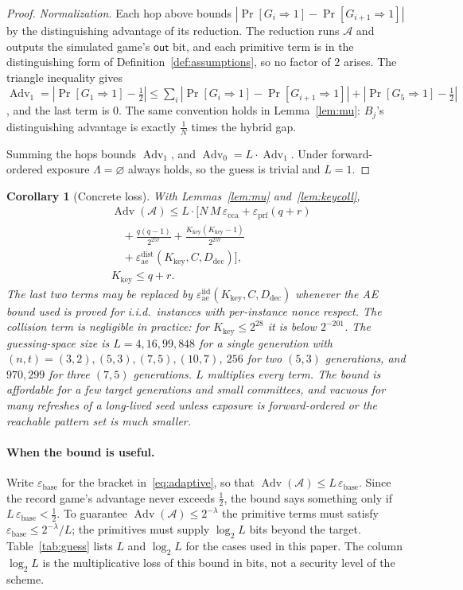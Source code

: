 \documentclass[pdflatex,sn-mathphys-num,twocolumn]{sn-jnl}
\theoremstyle{plain}
\newtheorem{corollary}[theorem]{Corollary}
\theoremstyle{definition}
\newcommand{\Adv}{\operatorname{Adv}}
\begin{document}
\begin{proof}
\emph{Normalization.} Each hop above bounds $|\Pr[G_i\Rightarrow1]-\Pr[G_{i+1}\Rightarrow1]|$ by the distinguishing advantage of its reduction. The reduction runs $\mathcal A$ and outputs the simulated game's $\mathsf{out}$ bit, and each primitive term is in the distinguishing form of Definition~\ref{def:assumptions}, so no factor of $2$ arises. The triangle inequality gives $\Adv_1=|\Pr[G_1\Rightarrow1]-\tfrac12|\le\sum_i|\Pr[G_i\Rightarrow1]-\Pr[G_{i+1}\Rightarrow1]|+|\Pr[G_5\Rightarrow1]-\tfrac12|$, and the last term is $0$. The same convention holds in Lemma~\ref{lem:mu}: $B_j$'s distinguishing advantage is exactly $\tfrac1N$ times the hybrid gap.

Summing the hops bounds $\Adv_1$, and $\Adv_0=L\cdot\Adv_1$. Under forward-ordered exposure $\Lambda=\varnothing$ always holds, so the guess is trivial and $L=1$.
\end{proof}

\begin{corollary}[Concrete loss]\label{cor:loss}
With Lemmas~\ref{lem:mu} and~\ref{lem:keycoll},
\begin{align*}
 &\Adv(\mathcal A)\le L\cdot\Big[N\,M\,\varepsilon_{\mathrm{cca}}+\varepsilon_{\mathrm{prf}}(q+r)\\
 &\quad+\frac{q(q-1)}{2^{257}}+\frac{K_{\mathrm{key}}(K_{\mathrm{key}}-1)}{2^{257}}\\
 &\quad+\varepsilon^{\mathrm{dist}}_{\mathrm{ae}}(K_{\mathrm{key}},C,D_{\mathrm{dec}})\Big],\\
 &K_{\mathrm{key}}\le q+r.
\end{align*}
The last two terms may be replaced by $\varepsilon^{\mathrm{iid}}_{\mathrm{ae}}(K_{\mathrm{key}},C,D_{\mathrm{dec}})$ whenever the AE bound used is proved for i.i.d.\ instances with per-instance nonce respect. The collision term is negligible in practice: for $K_{\mathrm{key}}\le2^{28}$ it is below $2^{-201}$.
The guessing-space size is $L=4,16,99,848$ for a single generation with $(n,t)=(3,2),(5,3),(7,5),(10,7)$, $256$ for two $(5,3)$ generations, and $970{,}299$ for three $(7,5)$ generations. $L$ multiplies every term. The bound is affordable for a few target generations and small committees, and vacuous for many refreshes of a long-lived seed unless exposure is forward-ordered or the reachable pattern set is much smaller.
\end{corollary}

\paragraph{When the bound is useful.}
Write $\varepsilon_{\mathrm{base}}$ for the bracket in~\eqref{eq:adaptive}, so that $\Adv(\mathcal A)\le L\,\varepsilon_{\mathrm{base}}$. Since the record game's advantage never exceeds $\tfrac12$, the bound says something only if $L\,\varepsilon_{\mathrm{base}}<\tfrac12$. To guarantee $\Adv(\mathcal A)\le2^{-\lambda}$ the primitive terms must satisfy $\varepsilon_{\mathrm{base}}\le2^{-\lambda}/L$; the primitives must supply $\log_2L$ bits beyond the target. Table~\ref{tab:guess} lists $L$ and $\log_2L$ for the cases used in this paper. The column $\log_2L$ is the multiplicative loss of this bound in bits, not a security level of the scheme.
\end{document}
